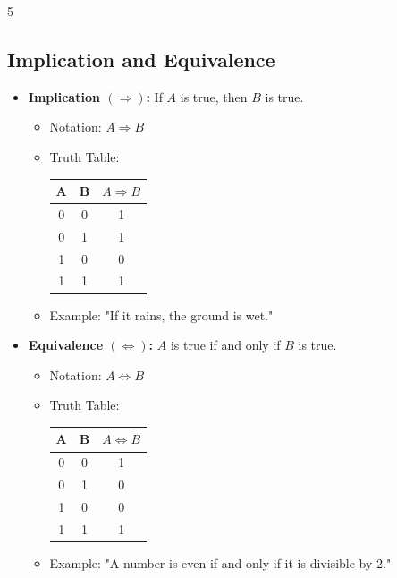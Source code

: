 \documentclass[a4paper,landscape]{article}
\begin{document}
\begin{multicols*}{5}
\subsection*{Implication and Equivalence}
\begin{itemize}[leftmargin=*, itemsep=0pt]
    \item \textbf{Implication $(\Rightarrow)$:} If $A$ is true, then $B$ is true.
    \begin{itemize}[leftmargin=*, itemsep=0pt]
        \item Notation: $A \Rightarrow B$
        \item Truth Table:
        \begin{center}
        \begin{tabular}{cc|c}
        A & B & $A \Rightarrow B$ \\
        \hline
        0 & 0 & 1 \\
        0 & 1 & 1 \\
        1 & 0 & 0 \\
        1 & 1 & 1 \\
        \end{tabular}
        \end{center}
        \item Example: "If it rains, the ground is wet."
    \end{itemize}
    \item \textbf{Equivalence $(\Leftrightarrow)$:} $A$ is true if and only if $B$ is true.
    \begin{itemize}[leftmargin=*, itemsep=0pt]
        \item Notation: $A \Leftrightarrow B$
        \item Truth Table:
        \begin{center}
        \begin{tabular}{cc|c}
        A & B & $A \Leftrightarrow B$ \\
        \hline
        0 & 0 & 1 \\
        0 & 1 & 0 \\
        1 & 0 & 0 \\
        1 & 1 & 1 \\
        \end{tabular}
        \end{center}
        \item Example: "A number is even if and only if it is divisible by 2."
    \end{itemize}
\end{itemize}


\end{multicols*}
\end{document}
